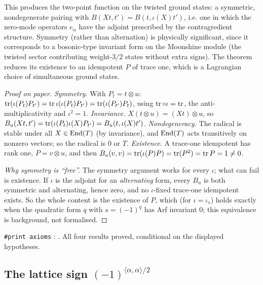 \begin{physics}
This produces the two-point function on the twisted ground states: a symmetric, nondegenerate pairing with $B(Xt,t')=B(t,\iota(X)t')$, i.e. one in which the zero-mode operators $e_\alpha$ have the adjoint prescribed by the contragredient structure. Symmetry (rather than alternation) is physically significant, since it corresponds to a bosonic-type invariant form on the Moonshine module (the twisted sector contributing weight-$3/2$ states without extra signs). The theorem reduces its existence to an idempotent $P$ of trace one, which is a Lagrangian choice of simultaneous ground states.
\end{physics}
\begin{proof}[Proof on paper]
\emph{Symmetry.} With $P_t=t\otimes u$: $\operatorname{tr}(\iota(P_t)P_{t'})=\operatorname{tr}\iota(\iota(P_t)P_{t'})=
\operatorname{tr}(\iota(P_{t'})P_t)$, using $\operatorname{tr}\circ\iota=\operatorname{tr}$, the anti-multiplicativity and $\iota^2=1$.
\emph{Invariance.} $X(t\otimes u)=(Xt)\otimes u$, so $B_u(Xt,t')=\operatorname{tr}(\iota(P_t)\iota(X)P_{t'})=
B_u(t,\iota(X)t')$.  \emph{Nondegeneracy.} The radical is stable under all $X\in\operatorname{End}(T)$ (by
invariance), and $\operatorname{End}(T)$ acts transitively on nonzero vectors; so the radical is $0$ or $T$.
\emph{Existence.} A trace-one idempotent has rank one, $P=v\otimes u$, and then
$B_u(v,v)=\operatorname{tr}(\iota(P)P)=\operatorname{tr}(P^2)=\operatorname{tr} P=1\ne0$.

\emph{Why symmetry is ``free''.}  The symmetry argument works for every $\iota$; what can fail is
existence.  If $\iota$ is the adjoint for an \emph{alternating} form, every $B_u$ is both symmetric
and alternating, hence zero, and no $\iota$-fixed trace-one idempotent exists.  So the whole
content is the existence of $P$, which (for $\iota=\iota_s$) holds exactly when the quadratic form
$q$ with $s=(-1)^q$ has Arf invariant $0$; this equivalence is background, not formalised.
\end{proof}
\begin{status}
\texttt{\#print axioms} : .  All four results proved, conditional on the displayed hypotheses.
\end{status}

\subsection{The lattice sign \texorpdfstring{$(-1)^{\langle\alpha,\alpha\rangle/2}$}{(-1)^(alpha,alpha)/2}}

